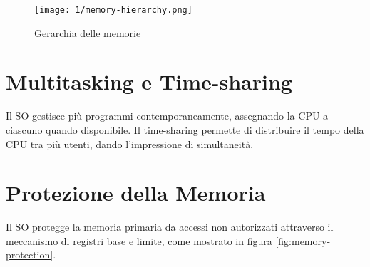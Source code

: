 \begin{figure}[h!]
    \centering
    \texttt{[image: 1/memory-hierarchy.png]}
    \caption{Gerarchia delle memorie}
    \label{fig:memory-hierarchy}
\end{figure}

\section{Multitasking e Time-sharing}
Il SO gestisce più programmi contemporaneamente, assegnando la CPU a ciascuno quando disponibile. Il time-sharing permette di distribuire il tempo della CPU tra più utenti, dando l'impressione di simultaneità.

\section{Protezione della Memoria}
Il SO protegge la memoria primaria da accessi non autorizzati attraverso il meccanismo di registri base e limite, come mostrato in figura \ref{fig:memory-protection}.
